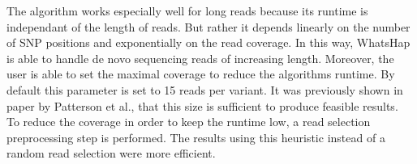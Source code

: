 The algorithm works especially well for long reads because its runtime is independant of the length of reads. But rather it depends linearly on the number of \ac{SNP} positions and exponentially on the read coverage. In this way, WhatsHap is able to handle de novo sequencing reads of increasing length. Moreover, the user is able to set the maximal coverage to reduce the algorithms runtime. By default this parameter is set to 15 reads per variant. It was previously shown in paper by Patterson et al., that this size is sufficient to produce feasible results. \cite{WhatsHap}\\
To reduce the coverage in order to keep the runtime low, a read selection preprocessing step is performed. The results using this heuristic instead of a random read selection were more efficient. \cite{Readselection}

